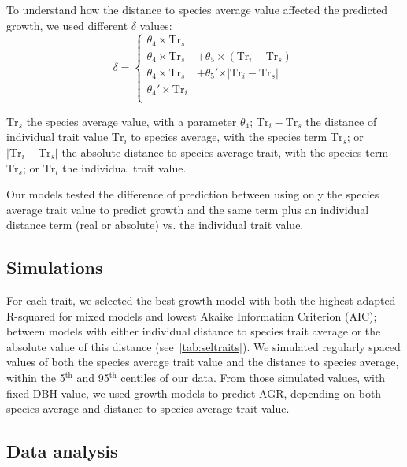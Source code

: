 To understand how the distance to species average value affected the predicted growth, we used different $\delta$ values:
\begin{equation}
	\label{eq:delta}
	\delta = \left\{
	\begin{aligned}
	\theta_4 \times \text{Tr}_s& \\
	\theta_4 \times \text{Tr}_s& + \theta_5 \times(\text{Tr}_i - \text{Tr}_s) \\
	\theta_4 \times \text{Tr}_s& + \theta_5' \times \vert \text{Tr}_i - \text{Tr}_s \vert \\
	\theta_4' \times \text{Tr}_i \\
	\end{aligned}
	\right.
\end{equation}

 $\text{Tr}_s$ the species average value, with a parameter $\theta_4$; $\text{Tr}_i - \text{Tr}_s$ the distance of individual trait value $\text{Tr}_i$ to species average, with the species term $\text{Tr}_s$; or $\vert \text{Tr}_i - \text{Tr}_s \vert$ the absolute distance to species average trait, with the species term $\text{Tr}_s$; or $\text{Tr}_i$ the individual trait value.

Our models tested the difference of prediction between using only the species average trait value to predict growth and the same term plus an individual distance term (real or absolute) vs. the individual trait value.

\subsection*{Simulations}

For each trait, we selected the best growth model with both the highest adapted R-squared for mixed models \citep{nakagawa_general_2013} and lowest Akaike Information Criterion (AIC); between models with either individual distance to species trait average or the absolute value of this distance (see~\autoref{tab:seltraits}). We simulated regularly spaced values of both the species average trait value and the distance to species average, within the 5$^{\text{th}}$ and 95$^{\text{th}}$ centiles of our data. From those simulated values, with fixed DBH value, we used growth models to predict AGR, depending on both species average and distance to species average trait value.

\subsection*{Data analysis}

